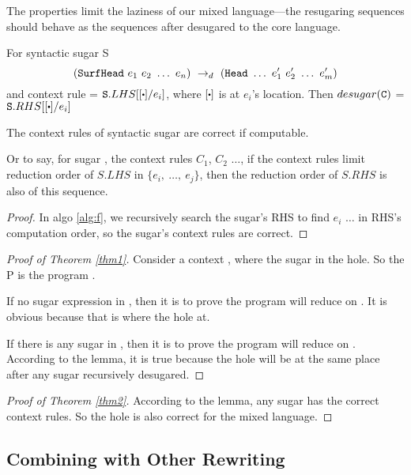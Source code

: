 The properties limit the laziness of our mixed language---the resugaring sequences should behave as the sequences after desugared to the core language.    

\begin{Def}
For syntactic sugar S
\[
(\mbox{\tt SurfHead}~e_1~e_2~\ldots~e_n) ~\rightarrow_d~ (\mbox{\tt Head}~\ldots~e_1'~e_2'~\ldots~e_m')
\]
and context rule  = $\m{S}.LHS[[\bigcdot]/e_i]$, where $[\bigcdot]$ is at $e_i$'s location. Then $desugar(\mbox{\tt C})$ = $\m{S}.RHS[[\bigcdot]/e_i]$

\end{Def}

\begin{lemma}
The context rules of syntactic sugar are correct if computable. 

Or to say, for sugar , the context rules $C_1$, $C_2$ $\ldots$, if the context rules limit reduction order of $S.LHS$ in $\{e_i,~\ldots,~e_j\}$, then the reduction order of $S.RHS$ is also of this sequence.

\end{lemma}

\begin{proof}
In algo \ref{alg:f}, we recursively search the sugar's RHS to find $e_i$ $\ldots$ in RHS's computation order, so the sugar's context rules are correct.
\end{proof}



\begin{proof}[Proof of Theorem \ref{thm1}]
Consider a context , where the sugar  in the hole. So the P is the program . 

If no sugar expression in , then it is to prove the program  will reduce on . It is obvious because that is where the hole at.

If there is any sugar in , then it is to prove the program  will reduce on . According to the lemma, it is true because the hole will be at the same place after any sugar recursively desugared.
\end{proof}

\begin{proof}[Proof of Theorem \ref{thm2}]
According to the lemma, any sugar has the correct context rules. So the hole is also correct for the mixed language.
\end{proof}

\subsection{Combining with Other Rewriting\todo{}}
